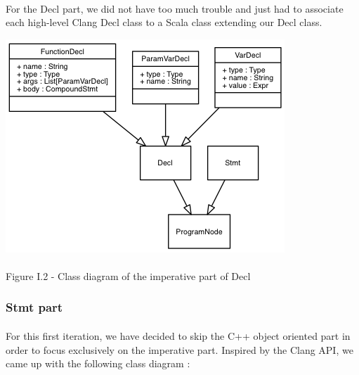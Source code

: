 \documentclass{report}
\begin{document}
\paragraph{}
\hspace{4mm}\textnormal{For the Decl part, we did not have too much trouble and just had to associate each high-level Clang Decl class to a Scala class extending
our Decl class.}

\begin{center}
\includegraphics[scale=0.8]{data/decl.png}
~\\~\\Figure I.2 - Class diagram of the imperative part of Decl
\end{center}

\subsubsection{Stmt part}

\paragraph{}
\hspace{4mm}\textnormal{For this first iteration, we have decided to skip the C++ object oriented part in order to focus exclusively 
on the imperative part. Inspired by the Clang API, we came up with the following class diagram :}
\end{document}
